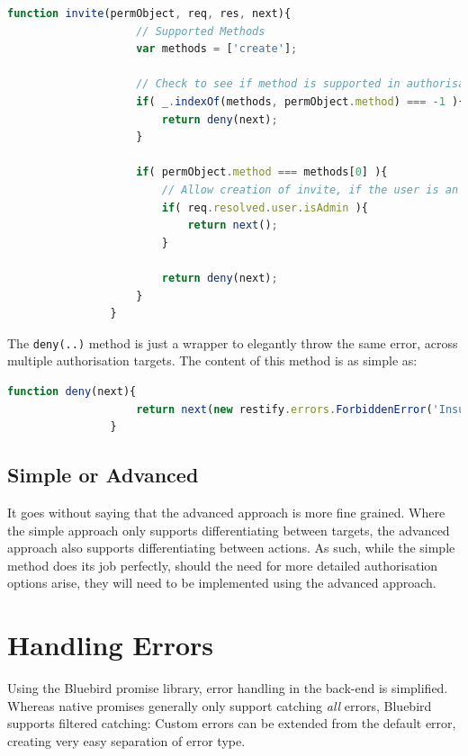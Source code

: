 			\begin{lstlisting}[gobble=16,language=JavaScript]
                function invite(permObject, req, res, next){
                    // Supported Methods
                    var methods = ['create'];
                    
                    // Check to see if method is supported in authorisation suite
                    if( _.indexOf(methods, permObject.method) === -1 ){
                        return deny(next);
                    }
                    
                    if( permObject.method === methods[0] ){
                        // Allow creation of invite, if the user is an admin
                        if( req.resolved.user.isAdmin ){
                            return next();
                        }

                        return deny(next);
                    }
                }			
			\end{lstlisting}
			The \verb=deny(..)= method is just a wrapper to elegantly throw the same error, across multiple authorisation targets. The content of this method is as simple as:
			\begin{lstlisting}[gobble=16,language=JavaScript]
                function deny(next){
                    return next(new restify.errors.ForbiddenError('Insufficient privileges'));
                }
			\end{lstlisting}

		\subsection{Simple or Advanced}
			It goes without saying that the advanced approach is more fine grained. Where the simple approach only supports differentiating between targets, the advanced approach also supports differentiating between actions. As such, while the simple method does its job perfectly, should the need for more detailed authorisation options arise, they will need to be implemented using the advanced approach.


	\section{Handling Errors}
		Using the Bluebird promise library, error handling in the back-end is simplified. Whereas native promises generally only support catching \emph{all} errors, Bluebird supports filtered catching: Custom errors can be extended from the default error, creating very easy separation of error type. 

